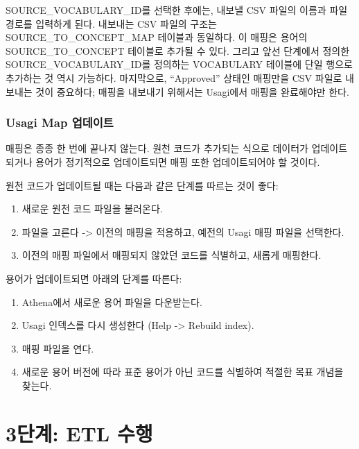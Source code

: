 \documentclass[10.5pt]{book}
\providecommand{\tightlist}{%
  \setlength{\itemsep}{0pt}\setlength{\parskip}{0pt}}
\theoremstyle{definition}
\theoremstyle{definition}
\theoremstyle{definition}
\theoremstyle{remark}
\begin{document}
SOURCE\_VOCABULARY\_ID를 선택한 후에는, 내보낼 CSV 파일의 이름과 파일
경로를 입력하게 된다. 내보내는 CSV 파일의 구조는
SOURCE\_TO\_CONCEPT\_MAP 테이블과 동일하다. 이 매핑은 용어의
SOURCE\_TO\_CONCEPT 테이블로 추가될 수 있다. 그리고 앞선 단계에서 정의한
SOURCE\_VOCABULARY\_ID를 정의하는 VOCABULARY 테이블에 단일 행으로
추가하는 것 역시 가능하다. 마지막으로, ``Approved'' 상태인 매핑만을 CSV
파일로 내보내는 것이 중요하다; 매핑을 내보내기 위해서는 Usagi에서 매핑을
완료해야만 한다.

\subsubsection*{Usagi Map 업데이트}\label{usagi-map-}

매핑은 종종 한 번에 끝나지 않는다. 원천 코드가 추가되는 식으로 데이터가
업데이트되거나 용어가 정기적으로 업데이트되면 매핑 또한 업데이트되어야
할 것이다.

원천 코드가 업데이트될 때는 다음과 같은 단계를 따르는 것이 좋다:

\begin{enumerate}
\def\labelenumi{\arabic{enumi}.}
\tightlist
\item
  새로운 원천 코드 파일을 불러온다.
\item
  파일을 고른다 -\textgreater{} 이전의 매핑을 적용하고, 예전의 Usagi
  매핑 파일을 선택한다.
\item
  이전의 매핑 파일에서 매핑되지 않았던 코드를 식별하고, 새롭게 매핑한다.
\end{enumerate}

용어가 업데이트되면 아래의 단계를 따른다:

\begin{enumerate}
\def\labelenumi{\arabic{enumi}.}
\tightlist
\item
  Athena에서 새로운 용어 파일을 다운받는다.
\item
  Usagi 인덱스를 다시 생성한다 (Help -\textgreater{} Rebuild index).
\item
  매핑 파일을 연다.
\item
  새로운 용어 버전에 따라 표준 용어가 아닌 코드를 식별하여 적절한 목표
  개념을 찾는다.
\end{enumerate}

\section{3단계: ETL 수행}\label{-etl-}
\end{document}
